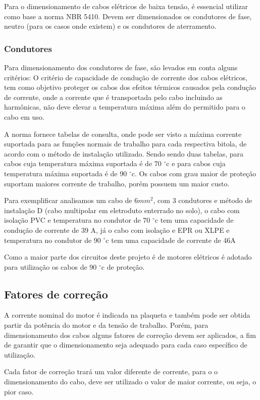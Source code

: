 Para o dimensionamento de cabos elétricos de baixa tensão, é essencial utilizar como base  a norma NBR 5410. Devem ser dimensionados os condutores de fase, neutro (para os casos onde existem) e os condutores de aterramento. %

\subsubsection{Condutores}

Para dimensionamento dos condutores de fase, são levados em conta alguns critérios: 
O critério de capacidade de condução de corrente dos cabos elétricos, tem como objetivo proteger os cabos dos efeitos térmicos causados pela condução de corrente, onde a corrente  que é transportada pelo cabo incluindo as harmônicas, não deve elevar a temperatura máxima além do permitido para o cabo em uso. 

A norma fornece tabelas de consulta, onde pode ser visto a máxima corrente suportada para as funções normais de trabalho para cada respectiva bitola, de acordo com o método de instalação utilizado. Sendo sendo duas tabelas, para cabos cuja temperatura máxima suportada é de 70 $^{\circ}$c e para cabos cuja temperatura máxima suportada é de 90 $^{\circ}$c. Os cabos com grau maior de proteção suportam maiores corrente de trabalho, porém possuem um maior custo. 

Para exemplificar analisamos um cabo de $6mm^2$, com 3 condutores e  método de instalação D (cabo multipolar em eletroduto enterrado no solo), o cabo com isolação PVC e temperatura no condutor de  70 $^{\circ}$c tem uma capacidade de condução de corrente de 39 A, já o cabo com isolação e EPR ou XLPE e temperatura no condutor de  90 $^{\circ}$c tem uma capacidade de corrente de 46A 

Como a maior parte dos circuitos deste projeto é de motores elétricos é adotado para utilização  os cabos de 90 $^{\circ}$c de proteção.

\subsection{Fatores de correção}
A corrente nominal do motor é indicada na plaqueta e também pode ser obtida partir da potência do motor e da tensão de trabalho. Porém, para dimensionamento dos cabos alguns fatores de correção devem ser aplicados, a fim de garantir que o dimensionamento seja adequado para cada caso específico de utilização. 

Cada fator de correção trará um valor diferente de corrente, para o o dimensionamento do cabo, deve ser utilizado o valor de maior corrente, ou seja, o pior caso.


